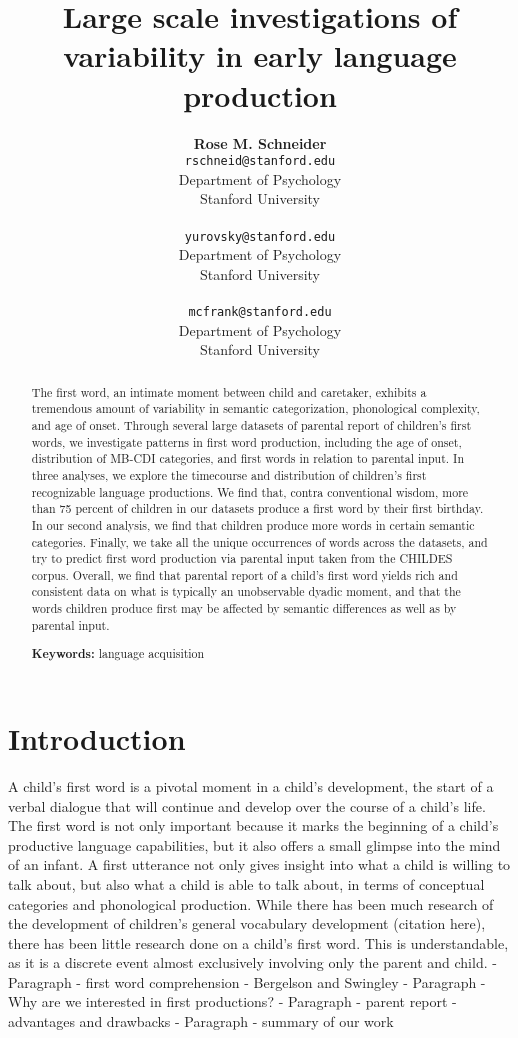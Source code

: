\documentclass[10pt,letterpaper]{article}
\title{Large scale investigations of variability in early language production}
\author{{\large \bf Rose M. Schneider} \\ \texttt{rschneid@stanford.edu}\\ Department of Psychology \\ Stanford University \\ 
\And {\large \bf Dan Yurovsky} \\ \texttt{yurovsky@stanford.edu} \\ Department of Psychology \\ Stanford University \\ 
\And {\large \bf Michael C. Frank} \\ \texttt{mcfrank@stanford.edu} \\ Department of Psychology \\ Stanford University \\ }
\begin{document}
\maketitle


\begin{abstract}
The first word, an intimate moment between child and caretaker, exhibits a tremendous amount of variability in semantic categorization, phonological complexity, and age of onset. Through several large datasets of parental report of children’s first words, we investigate patterns in first word production, including the age of onset, distribution of MB-CDI categories, and first words in relation to parental input. In three analyses, we explore the timecourse and distribution of children’s first recognizable language productions. We find that, contra conventional wisdom, more than 75 percent of children in our datasets produce a first word by their first birthday. In our second analysis, we find that children produce more words in certain semantic categories. Finally, we take all the unique occurrences of words across the datasets, and try to predict first word production via parental input taken from the CHILDES corpus. Overall, we find that parental report of a child’s first word yields rich and consistent data on what is typically an unobservable dyadic moment, and that the words children produce first may be affected by semantic differences as well as by parental input.

\textbf{Keywords:}
language acquisition
\end{abstract}

\section{Introduction}
A child's first word is a pivotal moment in a child's development, the start of a verbal dialogue that will continue and develop over the course of a child's life. The first word is not only important because it marks the beginning of a child's productive language capabilities, but it also offers a small glimpse into the mind of an infant. A first utterance not only gives insight into what a child is willing to talk about, but also what a child is able to talk about, in terms of conceptual categories and phonological production. While there has been much research of the development of children's general vocabulary development (citation here), there has been little research done on a child's first word. This is understandable, as it is a discrete event almost exclusively involving only the parent and child. 
- Paragraph - first word comprehension - Bergelson and Swingley
- Paragraph - Why are we interested in first productions?
- Paragraph - parent report - advantages and drawbacks 
- Paragraph - summary of our work
\end{document}
